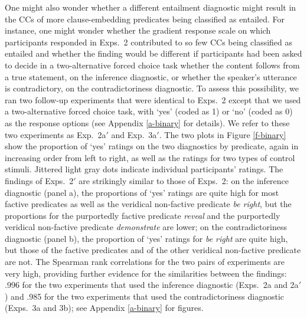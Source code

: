 \documentclass[11pt,fleqn]{article}
\newcommand{\6}{\mbox{$[\hspace*{-.6mm}[$}}
\newcommand{\9}{\mbox{$]\hspace*{-.6mm}]$}}
\begin{document}
{One might also wonder whether a different entailment diagnostic might result in the CCs of more clause-embedding predicates being classified as entailed. For instance, one might wonder whether the gradient response scale on which participants responded in Exps.~2 contributed to so few CCs being classified as entailed and whether the finding would be different if participants had been asked to decide in a two-alternative forced choice task whether the content follows from a true statement, on the inference diagnostic, or whether the speaker's utterance is contradictory, on the contradictoriness diagnostic. To assess this possibility, we ran two follow-up experiments that were identical to Exps.~2 except that we used a two-alternative forced choice task, with `yes' (coded as 1) or `no' (coded as 0) as the response options (see Appendix \ref{a-binary} for details). We refer to these two experiments as Exp.~2a$'$ and Exp.~3a$'$. The two plots in Figure \ref{f-binary} show the proportion of `yes' ratings on the two diagnostics by predicate, again in increasing order from left to right, as well as the ratings for two types of control stimuli. Jittered light gray dots indicate individual participants' ratings. The findings of Exps.~2$'$ are strikingly similar to those of Exps.~2: on the inference diagnostic (panel a), the proportions of `yes' ratings are quite high for most factive predicates as well as the veridical non-factive predicate {\em be right}, but the proportions for the purportedly factive predicate {\em reveal} and the purportedly veridical non-factive predicate {\em demonstrate} are lower; on the contradictoriness diagnostic (panel b), the proportion of `yes' ratings for {\em be right} are quite high, but those of the factive predicates and of the other veridical non-factive predicate are not. The Spearman rank correlations for the two pairs of experiments are very high, providing further evidence for the similarities between the findings: .996 for the two experiments that used the inference diagnostic (Exps.~2a and 2a$'$) and .985 for the two experiments that used the contradictoriness diagnostic (Exps.~3a and 3b); see Appendix \ref{a-binary} for figures.

}
\end{document}
